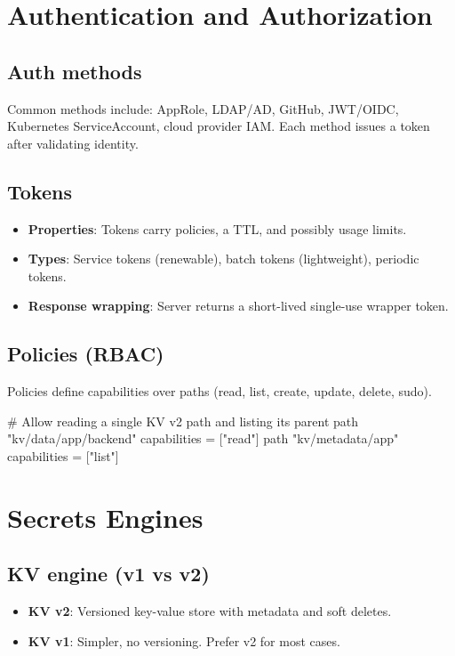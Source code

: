 \documentclass[11pt]{article}
\begin{document}
\section{Authentication and Authorization}

\subsection{Auth methods}

Common methods include: AppRole, LDAP/AD, GitHub, JWT/OIDC, Kubernetes ServiceAccount, cloud provider IAM. Each method issues a token after validating identity.

\subsection{Tokens}

\begin{itemize}
  \item \textbf{Properties}: Tokens carry policies, a TTL, and possibly usage limits.
  \item \textbf{Types}: Service tokens (renewable), batch tokens (lightweight), periodic tokens.
  \item \textbf{Response wrapping}: Server returns a short-lived single-use wrapper token.
\end{itemize}

\subsection{Policies (RBAC)}

Policies define capabilities over paths (read, list, create, update, delete, sudo).

\begin{textcode}
# Allow reading a single KV v2 path and listing its parent
path "kv/data/app/backend" {
  capabilities = ["read"]
}
path "kv/metadata/app" {
  capabilities = ["list"]
}
\end{textcode}

\section{Secrets Engines}

\subsection{KV engine (v1 vs v2)}

\begin{itemize}
  \item \textbf{KV v2}: Versioned key-value store with metadata and soft deletes.
  \item \textbf{KV v1}: Simpler, no versioning. Prefer v2 for most cases.
\end{itemize}
\end{document}
